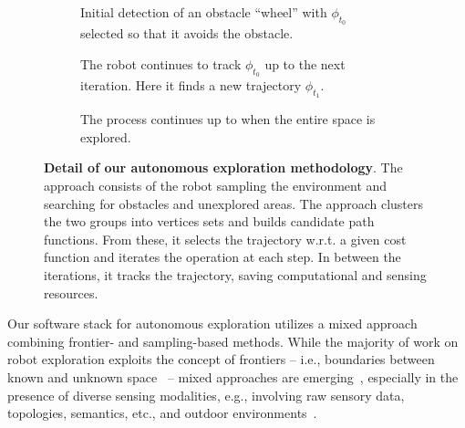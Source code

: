 \documentclass[letterpaper,10pt,conference,twoside]{IEEEtran}
\theoremstyle{definition}
\begin{document}
\begin{figure*}
  \begin{subfigure}[m]{0.33\textwidth}
    \centering
    
    \caption{Initial detection of an obstacle ``wheel'' with $\phi_{t_0}$ selected so that it avoids the obstacle.}
    \label{fig:3-1}
  \end{subfigure}
  \hfill
  \begin{subfigure}[m]{0.32\textwidth}
    \centering
    \hspace*{-.15cm}
    
    \caption{The robot continues to track $\phi_{t_0}$ up to the next iteration. Here it finds a new trajectory $\phi_{t_1}$.}
    \label{fig:3-2}
  \end{subfigure}
  \begin{subfigure}[m]{0.33\textwidth}
    \centering
    \hspace*{.05cm}
    
    \caption{The process continues up to when the entire space is explored.}
    \label{fig:3-3}
  \end{subfigure}
  \caption{\textbf{Detail of our autonomous exploration methodology}. The %
  approach consists of the robot sampling the environment and searching for obstacles and unexplored areas. The %
  approach clusters the two groups into vertices sets and builds candidate path functions. From these, it selects the %
  trajectory w.r.t. a given cost function and iterates the operation at each step. In between the iterations, it tracks the trajectory, saving computational and sensing resources.}
  \label{fig:3}
\end{figure*}
\noindent
Our software stack for autonomous exploration utilizes a mixed approach 
combining frontier- and sampling-based methods. 
While the majority 
of work on robot exploration 
exploits the concept of frontiers -- %
i.e., boundaries between known and unknown space~\cite{%
placed2022survey,dang2019graph} -- mixed approaches are emerging~\cite{dai2020fast,schmid2020efficient,placed2022survey}, 
especially %
in the presence of diverse sensing modalities, e.g., involving raw sensory data, topologies, semantics, etc., and outdoor %
environments~\cite{placed2022survey,batinovic2021multi}. 
%
\end{document}
